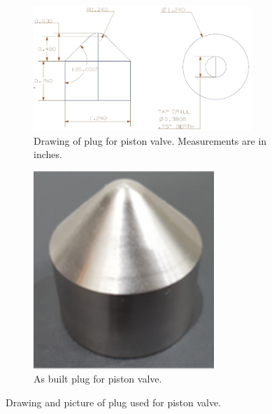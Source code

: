 \begin{figure}[htbp]
    \vspace{16pt}
    \centering
    \begin{subfigure}[t]{0.6\textwidth}
        \centering
        \includegraphics[width=0.9\textwidth]{design/photos/plug_gen1_drawing.PNG}
        \caption{Drawing of plug for piston valve. Measurements are in inches.}
        \label{fig:plug draw}
    \end{subfigure}
    \hfill
    \begin{subfigure}[t]{0.35\textwidth}
        \centering
        \includegraphics[width=0.75\textwidth]{design/photos/cobalt_plug.png}
        \caption{As built plug for piston valve.}
        \label{fig:cobalt plug}
    \end{subfigure}
    \caption{Drawing and picture of plug used for piston valve.}
    \label{fig:plug}
    \vspace{16pt}
\end{figure}

